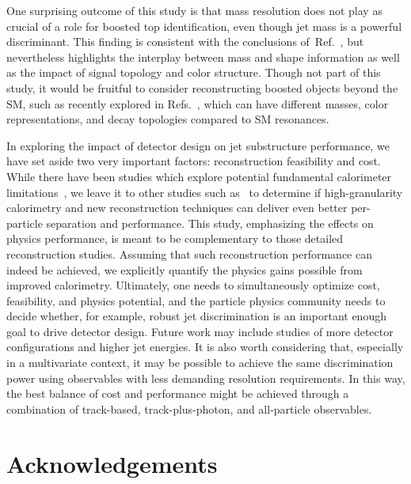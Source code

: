 \documentclass[11pt,letterpaper]{article}
\DeclareRobustCommand{\Ref}[1]{Ref.~\cite{#1}}
\DeclareRobustCommand{\Refs}[1]{Refs.~\cite{#1}}
\begin{document}
One surprising outcome of this study is that mass resolution does not play as crucial of a role for boosted top identification, even though jet mass is a powerful discriminant.
%
This finding is consistent with the conclusions of~\Ref{Larkoski:2015yqa}, but nevertheless highlights the interplay between mass and shape information as well as the impact of signal topology and color structure.
%
Though not part of this study, it would be fruitful to consider reconstructing boosted objects beyond the SM, such as recently explored in \Refs{Aguilar-Saavedra:2017zuc,Sirunyan:2017dnz,Aguilar-Saavedra:2017rzt}, which can have different masses, color representations, and decay topologies compared to SM resonances.

In exploring the impact of detector design on jet substructure performance, we have set aside two very important factors: reconstruction feasibility and cost.
%  
While there have been studies which explore potential fundamental calorimeter limitations~\cite{Bressler:2015uma},
we leave it to other studies such as~\cite{Chekanov:2016ppq,Chekanov:talk1,Chekanov:talk2} to determine if high-granularity calorimetry and new reconstruction techniques can deliver even better per-particle separation and performance.
This study, emphasizing the effects on physics performance, is meant to be complementary to those detailed reconstruction studies.  Assuming that such reconstruction performance can indeed be achieved, we explicitly quantify the physics gains possible from improved calorimetry.
%
Ultimately, one needs to simultaneously optimize cost, feasibility, and physics potential, and the particle physics community needs to decide whether, for example, robust jet discrimination is an important enough goal to drive detector design.
%
Future work may include studies of more detector configurations and higher jet energies.
%
It is also worth considering that, especially in a multivariate context, it may be possible to achieve the same discrimination power using observables with less demanding resolution requirements.
%
In this way, the best balance of cost and performance might be achieved through a combination of track-based, track-plus-photon, and all-particle observables. 

\section*{Acknowledgements}
\end{document}
